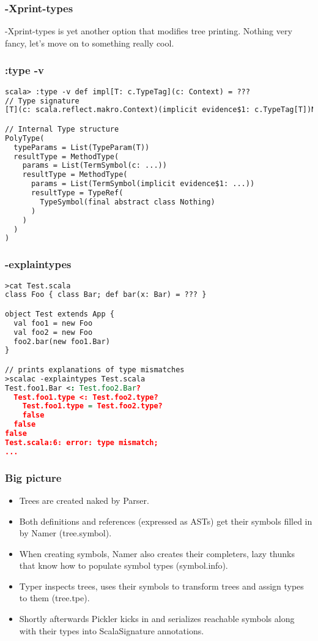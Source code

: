 \documentclass[hyperref={bookmarks=false}]{beamer}
\begin{document}
\begin{frame}[fragile]
\frametitle{-Xprint-types}

-Xprint-types is yet another option that modifies tree printing.
Nothing very fancy, let's move on to something really cool.

\end{frame}

\begin{frame}[fragile]
\frametitle{:type -v}

\begin{lstlisting}[language=XML]
scala> :type -v def impl[T: c.TypeTag](c: Context) = ???
// Type signature
[T](c: scala.reflect.makro.Context)(implicit evidence$1: c.TypeTag[T])Nothing

// Internal Type structure
PolyType(
  typeParams = List(TypeParam(T))
  resultType = MethodType(
    params = List(TermSymbol(c: ...))
    resultType = MethodType(
      params = List(TermSymbol(implicit evidence$1: ...))
      resultType = TypeRef(
        TypeSymbol(final abstract class Nothing)
      )
    )
  )
)
\end{lstlisting}
\end{frame}

\begin{frame}[fragile]
\frametitle{-explaintypes}

\begin{lstlisting}[language=XML]
>cat Test.scala
class Foo { class Bar; def bar(x: Bar) = ??? }

object Test extends App {
  val foo1 = new Foo
  val foo2 = new Foo
  foo2.bar(new foo1.Bar)
}

// prints explanations of type mismatches
>scalac -explaintypes Test.scala
Test.foo1.Bar <: Test.foo2.Bar?
  Test.foo1.type <: Test.foo2.type?
    Test.foo1.type = Test.foo2.type?
    false
  false
false
Test.scala:6: error: type mismatch;
...
\end{lstlisting}
\end{frame}

\begin{frame}[fragile]
\frametitle{Big picture}

\begin{itemize}
\item Trees are created naked by Parser.
\item Both definitions and references (expressed as ASTs) get their symbols filled in by Namer (tree.symbol).
\item When creating symbols, Namer also creates their completers, lazy thunks that know how to populate symbol types (symbol.info).
\item Typer inspects trees, uses their symbols to transform trees and assign types to them (tree.tpe).
\item Shortly afterwards Pickler kicks in and serializes reachable symbols along with their types into ScalaSignature annotations.
\end{itemize}
\end{frame}
\end{document}
